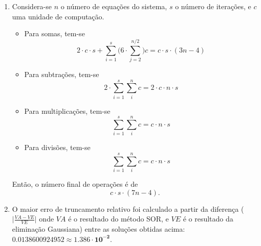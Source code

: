 \documentclass{article}
\newenvironment{arabenum}{
    \begin{enumerate}[label=\textbf{\arabic*})]
}{
    \end{enumerate}
}
\newenvironment{alphenum}{
    \begin{enumerate}[label=(\alph*)]
}{
    \end{enumerate}
}
\begin{document}
\begin{arabenum}
\begin{alphenum}
\item Considera-se $n$ o número de equações do sistema, $s$ o número de
iterações, e $c$ uma unidade de computação.

\begin{itemize}

\item Para somas, tem-se
\begin{equation*}
2 \cdot c \cdot s + \sum_{i=1}^s \Big( 6 \cdot \sum_{j=2}^{n/2} \Big) c
= c \cdot s \cdot (3n - 4)
\end{equation*}

\item Para subtrações, tem-se
\begin{equation*}
2 \cdot \sum_{i=1}^s \sum_{i}^n c = 2 \cdot c \cdot n \cdot s
\end{equation*}

\item Para multiplicações, tem-se
\begin{equation*}
\sum_{i=1}^s \sum_{i}^n c = c \cdot n \cdot s
\end{equation*}

\item Para divisões, tem-se
\begin{equation*}
\sum_{i=1}^s \sum_{i}^n c = c \cdot n \cdot s
\end{equation*}

\end{itemize}

Então, o número final de operações é de
\begin{equation*}
c \cdot s \cdot (7n - 4).
\end{equation*}

\item O maior erro de truncamento relativo foi calculado a partir da diferença
($\big\vert \frac{VA - VE}{VE} \big\vert$ onde $VA$ é o resultado do método SOR,
e $VE$ é o resultado da eliminação Gaussiana) entre as soluções obtidas acima:
$0.0138600924952 \approx \boldsymbol{1.386 \cdot 10^{-2}}$.

\end{alphenum}

\end{arabenum}
\end{document}
